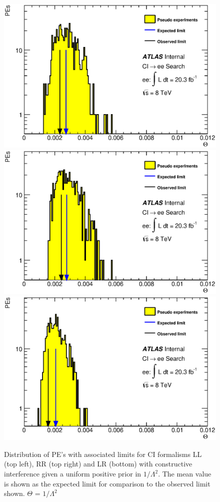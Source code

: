     \begin{figure}[h]
        \begin{center}
            \includegraphics[width=0.7\linewidth]{images/ee__LL_minus_L2/Theta.eps}
            \includegraphics[width=0.7\linewidth]{images/ee__RR_minus_L2/Theta.eps}
            \includegraphics[width=0.7\linewidth]{images/ee__LR_minus_L2/Theta.eps}
        \end{center}
       \caption{Distribution of PE's with associated limits for CI formalisms LL (top left), RR (top right) and LR (bottom) with constructive interference given a uniform positive prior in $1/\Lambda^{2}$. The mean value is shown as the expected limit for comparison to the observed limit shown. $\Theta$ = $1/\Lambda^{2}$}
       \label{fig:Theta_CI_con}
    \end{figure}


